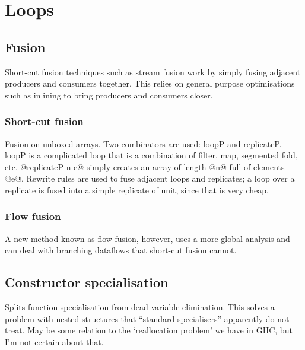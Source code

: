 \section{Loops}

\subsection{Fusion}
Short-cut fusion techniques such as stream fusion \cite{coutts2007streamfusion}
work by simply fusing adjacent producers and consumers together.
This relies on general purpose optimisations such as inlining to bring producers and consumers closer. 

\subsubsection{Short-cut fusion}


Fusion on unboxed arrays. Two combinators are used: loopP and replicateP.
loopP is a complicated loop that is a combination of filter, map, segmented fold, etc.
@replicateP n e@ simply creates an array of length @n@ full of elements @e@.
Rewrite rules are used to fuse adjacent loops and replicates; a loop over a replicate is
fused into a simple replicate of unit, since that is very cheap.


\subsubsection{Flow fusion}

A new method known as flow fusion\cite{lippmeier2013flow}, however, uses a more global analysis
and can deal with branching dataflows that short-cut fusion cannot.

\subsection{Constructor specialisation}

Splits function specialisation from dead-variable elimination.
This solves a problem with nested structures that ``standard specialisers'' apparently do not treat.
May be some relation to the `reallocation problem' we have in GHC, but I'm not certain about that.




